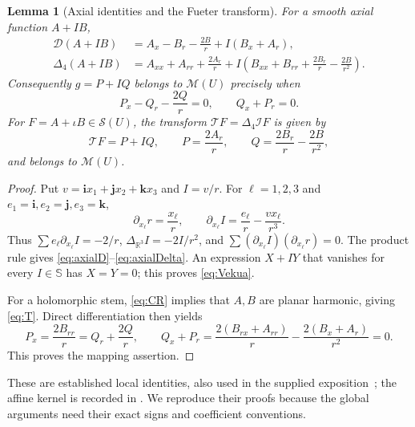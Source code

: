 \documentclass[11pt,a4paper]{article}
\numberwithin{equation}{section}
\newtheorem{lemma}[theorem]{Lemma}
\theoremstyle{definition}
\theoremstyle{remark}
\newcommand{\R}{\mathbb R}
\newcommand{\SSS}{\mathbb S}
\newcommand{\cS}{\mathscr S}
\newcommand{\cM}{\mathscr M}
\newcommand{\cI}{\mathcal I}
\newcommand{\cD}{\mathcal D}
\newcommand{\lap}{\Delta_4}
\newcommand{\T}{\mathcal T}
\begin{document}
\begin{lemma}[Axial identities and the Fueter transform]
\label{lem:identities}
For a smooth axial function $A+IB$,
\begin{align}
 \cD(A+IB)&=A_x-B_r-\frac{2B}{r}+I(B_x+A_r),
 \label{eq:axialD}\\
 \lap(A+IB)&=A_{xx}+A_{rr}+\frac{2A_r}{r}
  +I\left(B_{xx}+B_{rr}+\frac{2B_r}{r}-\frac{2B}{r^2}\right).
 \label{eq:axialDelta}
\end{align}
Consequently $g=P+IQ$ belongs to $\cM(U)$ precisely when
\begin{equation}
 P_x-Q_r-\frac{2Q}{r}=0,\qquad Q_x+P_r=0.
 \label{eq:Vekua}
\end{equation}
For $F=A+\iota B\in\cS(U)$, the transform $\T F=\lap\cI F$ is given by
\begin{equation}
 \T F=P+IQ,\qquad
 P=\frac{2A_r}{r},\qquad
 Q=\frac{2B_r}{r}-\frac{2B}{r^2},
 \label{eq:T}
\end{equation}
and belongs to $\cM(U)$.
\end{lemma}
\begin{proof}
Put $v=\mathbf i x_1+\mathbf jx_2+\mathbf kx_3$ and $I=v/r$.
For $\ell=1,2,3$ and $e_1=\mathbf i,e_2=\mathbf j,e_3=\mathbf k$,
\[
 \partial_{x_\ell}r=\frac{x_\ell}{r},\qquad
 \partial_{x_\ell}I=\frac{e_\ell}{r}-\frac{v x_\ell}{r^3}.
\]
Thus $\sum e_\ell\partial_{x_\ell}I=-2/r$,
$\Delta_{\R^3}I=-2I/r^2$, and
$\sum(\partial_{x_\ell}I)(\partial_{x_\ell}r)=0$.
The product rule gives \eqref{eq:axialD}--\eqref{eq:axialDelta}.
An expression $X+IY$ that vanishes for every $I\in\SSS$ has $X=Y=0$;
this proves \eqref{eq:Vekua}.

For a holomorphic stem, \eqref{eq:CR} implies that $A,B$ are planar
harmonic, giving \eqref{eq:T}. Direct differentiation then yields
\[
 P_x=\frac{2B_{rr}}r=Q_r+\frac{2Q}r,
 \qquad
 Q_x+P_r=\frac{2(B_{rx}+A_{rr})}r
             -\frac{2(B_x+A_r)}{r^2}=0.
\]
This proves the mapping assertion.
\end{proof}

These are established local identities, also used in the supplied
exposition~\cite{Source}; the affine kernel is recorded in
\cite[Lemma~23]{KP}. We reproduce their proofs because the global arguments
need their exact signs and coefficient conventions.
\end{document}
